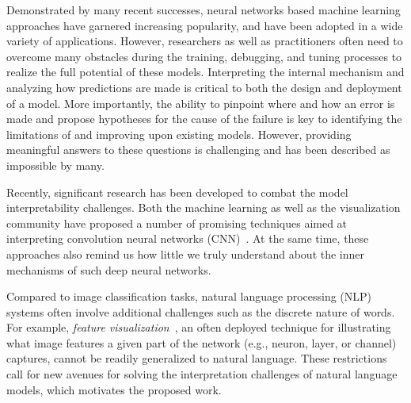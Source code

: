 \maketitle

Demonstrated by many recent successes, neural networks based machine learning approaches have garnered increasing popularity, and have been adopted in a wide variety of applications.
%
However, researchers as well as practitioners often need to overcome many obstacles during the training, debugging, and tuning processes to realize the full potential of these models.
%
Interpreting the internal mechanism and analyzing how predictions are made is critical to both the design and deployment of a model.
More importantly, the ability to pinpoint where and how an error is made and propose hypotheses for the cause of the failure is key to identifying the limitations of and improving upon existing models.
However, providing meaningful answers to these questions is challenging and has been described as impossible by many.

Recently, significant research has been developed to combat the model interpretability challenges.
Both the machine learning as well as the visualization community have proposed a number of promising techniques aimed at interpreting convolution neural networks (CNN)~\cite{SimonyanVedaldiZisserman2013, ZeilerFergus2014, YosinskiCluneNguyen2015, OlahMordvintsevSchubert2017, LiuShiLi2017, OlahSatyanarayanJohnson2018, BilalJourablooYe2018}.
At the same time, these approaches also remind us how little we truly understand about the inner mechanisms of such deep neural networks.

Compared to image classification tasks, natural language processing (NLP) systems often involve additional challenges such as the discrete nature of words.
For example, \emph{feature visualization}~\cite{OlahMordvintsevSchubert2017}, an often deployed technique for illustrating what image features a given part of the network (e.g., neuron, layer, or channel) captures, cannot be readily generalized to natural language.
%
These restrictions call for new avenues for solving the interpretation challenges of natural language models, which motivates the proposed work.

